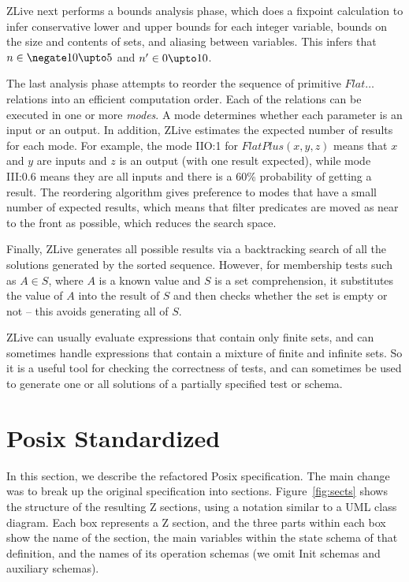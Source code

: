 \documentclass{llncs}
\begin{document}
ZLive next performs a bounds analysis phase, which does a fixpoint
calculation to infer conservative lower and upper bounds for each
integer variable, bounds on the size and contents of sets, and
aliasing between variables.  This infers that $n \in \negate 10 \upto
5$ and $n' \in 0 \upto 10$.

The last analysis phase attempts to reorder the sequence of primitive
$Flat\ldots$ relations into an efficient computation order.  Each of
the relations can be executed in one or more \emph{modes}.  A mode
determines whether each parameter is an input or an output.  In
addition, ZLive estimates the expected number of results for each
mode.  For example, the mode IIO:1 for $FlatPlus(x,y,z)$ means that
$x$ and $y$ are inputs and $z$ is an output (with one result
expected), while mode III:0.6 means they are all inputs and there is a
60\% probability of getting a result.  The reordering algorithm gives
preference to modes that have a small number of expected results,
which means that filter predicates are moved as near to the front as
possible, which reduces the search space.

Finally, ZLive generates all possible results via a backtracking
search of all the solutions generated by the sorted sequence.
However, for membership tests such as $A \in S$, where $A$ is a known
value and $S$ is a set comprehension, it substitutes the value of $A$
into the result of $S$ and then checks whether the set is empty or not
-- this avoids generating all of $S$.

ZLive can usually evaluate expressions that contain only finite sets,
and can sometimes handle expressions that contain a mixture of finite
and infinite sets.  So it is a useful tool for checking the correctness
of tests, and can sometimes be used to generate one or all solutions
of a partially specified test or schema.


\section{Posix Standardized}\label{sect:posix}

In this section, we describe the refactored Posix specification.
The main change was to break up the original specification into
sections.  Figure~\ref{fig:sects} shows the structure of the
resulting Z sections, using a notation similar to a UML class diagram.
Each box represents a Z section, and the three parts within each box
show the name of the section, the main variables within the state
schema of that definition, and the names of its operation schemas
(we omit Init schemas and auxiliary schemas).
\end{document}
